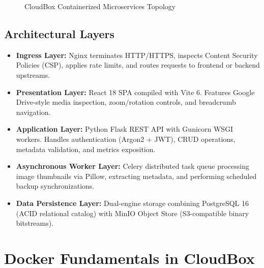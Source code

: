 \documentclass[11pt,a4paper]{report}
\begin{document}
\begin{figure}[h!]
\caption{CloudBox Containerized Microservices Topology}
\end{figure}

\section{Architectural Layers}
\begin{itemize}[itemsep=1pt,topsep=1pt]
    \item \textbf{Ingress Layer:} Nginx terminates HTTP/HTTPS, inspects Content Security Policies (CSP), applies rate limits, and routes requests to frontend or backend upstreams.
    \item \textbf{Presentation Layer:} React 18 SPA compiled with Vite 6. Features Google Drive-style media inspection, zoom/rotation controls, and breadcrumb navigation.
    \item \textbf{Application Layer:} Python Flask REST API with Gunicorn WSGI workers. Handles authentication (Argon2 + JWT), CRUD operations, metadata validation, and metrics exposition.
    \item \textbf{Asynchronous Worker Layer:} Celery distributed task queue processing image thumbnails via Pillow, extracting metadata, and performing scheduled backup synchronizations.
    \item \textbf{Data Persistence Layer:} Dual-engine storage combining PostgreSQL 16 (ACID relational catalog) with MinIO Object Store (S3-compatible binary bitstreams).
\end{itemize}

\clearpage

\chapter{Docker Fundamentals in CloudBox}
\end{document}
